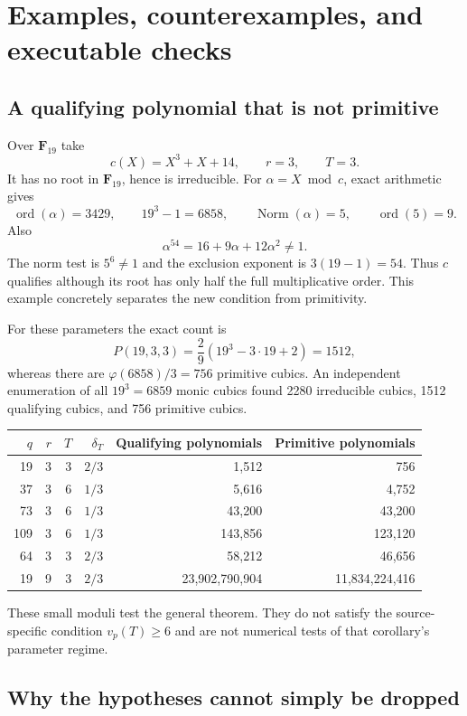 \documentclass[11pt,a4paper]{article}
\newcommand{\F}{\mathbf F}
\newcommand{\ord}{\operatorname{ord}}
\newcommand{\Nm}{\operatorname{Norm}}
\theoremstyle{definition}
\theoremstyle{remark}
\begin{document}
\section{Examples, counterexamples, and executable checks}
\label{sec:checks}

\subsection{A qualifying polynomial that is not primitive}

Over $\F_{19}$ take
\[
 c(X)=X^3+X+14,\qquad r=3,\qquad T=3.
\]
It has no root in $\F_{19}$, hence is irreducible. For
$\alpha=X\bmod c$, exact arithmetic gives
\[
 \ord(\alpha)=3429,\qquad 19^3-1=6858,
 \qquad\Nm(\alpha)=5,\qquad\ord(5)=9.
\]
Also
\[
 \alpha^{54}=16+9\alpha+12\alpha^2\ne1.
\]
The norm test is $5^6\ne1$ and the exclusion exponent is
$3(19-1)=54$. Thus $c$ qualifies although its root has only half the
full multiplicative order. This example concretely separates the new
condition from primitivity.

For these parameters the exact count is
\[
 P(19,3,3)=\frac{2}{9}(19^3-3\cdot19+2)=1512,
\]
whereas there are $\varphi(6858)/3=756$ primitive cubics. An independent
enumeration of all $19^3=6859$ monic cubics found 2280 irreducible cubics,
1512 qualifying cubics, and 756 primitive cubics.

\begin{center}
\small
\begin{tabular}{@{}rrrrrr@{}}
\toprule
$q$ & $r$ & $T$ & $\delta_T$ & Qualifying polynomials & Primitive polynomials \\
\midrule
19 & 3 & 3 & $2/3$ & 1,512 & 756 \\
37 & 3 & 6 & $1/3$ & 5,616 & 4,752 \\
73 & 3 & 6 & $1/3$ & 43,200 & 43,200 \\
109 & 3 & 6 & $1/3$ & 143,856 & 123,120 \\
64 & 3 & 3 & $2/3$ & 58,212 & 46,656 \\
19 & 9 & 3 & $2/3$ & 23,902,790,904 & 11,834,224,416 \\
\bottomrule
\end{tabular}
\end{center}

These small moduli test the general theorem. They do not satisfy the
source-specific condition $v_p(T)\ge6$ and are not numerical tests of
that corollary's parameter regime.

\subsection{Why the hypotheses cannot simply be dropped}
\end{document}
